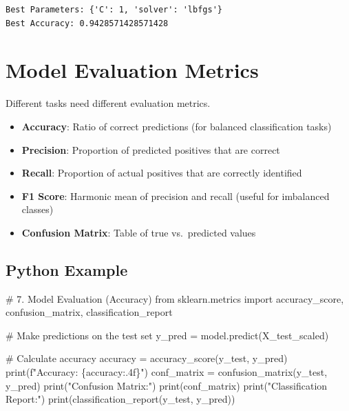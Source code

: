 \documentclass[
  letterpaper,
  DIV=11,
  numbers=noendperiod]{scrreprt}
\newenvironment{Shaded}{\begin{snugshade}}{\end{snugshade}}
\newcommand{\BuiltInTok}[1]{\textcolor[rgb]{0.00,0.23,0.31}{#1}}
\newcommand{\CommentTok}[1]{\textcolor[rgb]{0.37,0.37,0.37}{#1}}
\newcommand{\ImportTok}[1]{\textcolor[rgb]{0.00,0.46,0.62}{#1}}
\newcommand{\NormalTok}[1]{\textcolor[rgb]{0.00,0.23,0.31}{#1}}
\newcommand{\OperatorTok}[1]{\textcolor[rgb]{0.37,0.37,0.37}{#1}}
\newcommand{\SpecialCharTok}[1]{\textcolor[rgb]{0.37,0.37,0.37}{#1}}
\newcommand{\SpecialStringTok}[1]{\textcolor[rgb]{0.13,0.47,0.30}{#1}}
\newcommand{\StringTok}[1]{\textcolor[rgb]{0.13,0.47,0.30}{#1}}
\providecommand{\tightlist}{%
  \setlength{\itemsep}{0pt}\setlength{\parskip}{0pt}}\usepackage{longtable,booktabs,array}
\begin{document}
\begin{verbatim}
Best Parameters: {'C': 1, 'solver': 'lbfgs'}
Best Accuracy: 0.9428571428571428
\end{verbatim}

\section{Model Evaluation Metrics}\label{model-evaluation-metrics}

Different tasks need different evaluation metrics.

\begin{itemize}
\tightlist
\item
  \textbf{Accuracy}: Ratio of correct predictions (for balanced
  classification tasks)\\
\item
  \textbf{Precision}: Proportion of predicted positives that are
  correct\\
\item
  \textbf{Recall}: Proportion of actual positives that are correctly
  identified\\
\item
  \textbf{F1 Score}: Harmonic mean of precision and recall (useful for
  imbalanced classes)\\
\item
  \textbf{Confusion Matrix}: Table of true vs.~predicted values
\end{itemize}

\subsection{Python Example}\label{python-example-4}

\begin{Shaded}
\begin{Highlighting}[]
\CommentTok{\# 7. Model Evaluation (Accuracy)}
\ImportTok{from}\NormalTok{ sklearn.metrics }\ImportTok{import}\NormalTok{ accuracy\_score, confusion\_matrix, classification\_report}

\CommentTok{\# Make predictions on the test set}
\NormalTok{y\_pred }\OperatorTok{=}\NormalTok{ model.predict(X\_test\_scaled)}

\CommentTok{\# Calculate accuracy}
\NormalTok{accuracy }\OperatorTok{=}\NormalTok{ accuracy\_score(y\_test, y\_pred)}
\BuiltInTok{print}\NormalTok{(}\SpecialStringTok{f"Accuracy: }\SpecialCharTok{\{}\NormalTok{accuracy}\SpecialCharTok{:.4f\}}\SpecialStringTok{"}\NormalTok{)}
\NormalTok{conf\_matrix }\OperatorTok{=}\NormalTok{ confusion\_matrix(y\_test, y\_pred)}
\BuiltInTok{print}\NormalTok{(}\StringTok{"Confusion Matrix:"}\NormalTok{)}
\BuiltInTok{print}\NormalTok{(conf\_matrix)}
\BuiltInTok{print}\NormalTok{(}\StringTok{"Classification Report:"}\NormalTok{)}
\BuiltInTok{print}\NormalTok{(classification\_report(y\_test, y\_pred))}
\end{Highlighting}
\end{Shaded}
\end{document}
